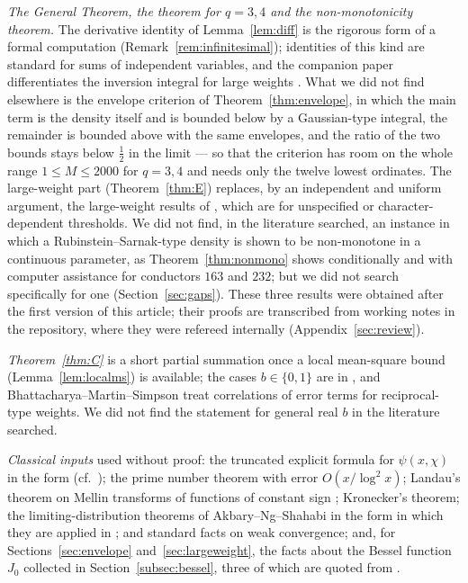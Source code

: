 \documentclass[11pt]{amsart}
\theoremstyle{definition}
\numberwithin{equation}{section}
\begin{document}
\emph{The General Theorem, the theorem for $q=3,4$ and the
non-monotonicity theorem.} The derivative identity of
Lemma~\ref{lem:diff} is the rigorous form of a formal computation
(Remark~\ref{rem:infinitesimal}); identities of this kind are
standard for sums of independent variables, and the companion paper
differentiates the inversion integral for large weights
\cite[Lemma~21]{WR}. What we did not find elsewhere is the envelope
criterion of Theorem~\ref{thm:envelope}, in which the main term is the
density itself and is bounded below by a Gaussian-type integral, the
remainder is bounded above with the same envelopes, and the ratio of
the two bounds stays below $\tfrac12$ in the limit --- so that the
criterion has room on the whole range $1\le M\le2000$ for $q=3,4$ and
needs only the twelve lowest ordinates. The large-weight part
(Theorem~\ref{thm:E}) replaces, by an independent and uniform
argument, the large-weight results of \cite{WR}, which are for
unspecified or character-dependent thresholds. We did not find, in
the literature searched, an instance in which a Rubinstein--Sarnak-type
density is shown to be non-monotone in a continuous parameter, as
Theorem~\ref{thm:nonmono} shows conditionally and with computer
assistance for conductors $163$ and $232$; but we did not search
specifically for one (Section~\ref{sec:gaps}). These three results were obtained after the
first version of this article; their proofs are transcribed from
working notes in the repository, where they were refereed internally
(Appendix~\ref{sec:review}).

\emph{Theorem~\ref{thm:C}} is a short partial summation once a local
mean-square bound (Lemma~\ref{lem:localms}) is available; the cases
$b\in\{0,1\}$ are in \cite{WR}, and Bhattacharya--Martin--Simpson
\cite{BMS26} treat correlations of error terms for reciprocal-type
weights. We did not find the statement for general real $b$ in the
literature searched.

\emph{Classical inputs} used without proof: the truncated explicit
formula for $\psi(x,\chi)$ in the form \cite[Lemma~1]{WR} (cf.\
\cite[Ch.~19]{Dav00}); the prime number theorem with error
$O(x/\log^2x)$; Landau's theorem on Mellin transforms of functions of
constant sign \cite[Lemma~15.1]{MV07}; Kronecker's theorem; the
limiting-distribution theorems of Akbary--Ng--Shahabi \cite{ANS14} in
the form in which they are applied in \cite{WR}; and standard facts on
weak convergence; and, for Sections~\ref{sec:envelope}
and~\ref{sec:largeweight}, the facts about the Bessel function $J_0$
collected in Section~\ref{subsec:bessel}, three of which are quoted
from \cite{WR}.
\end{document}
